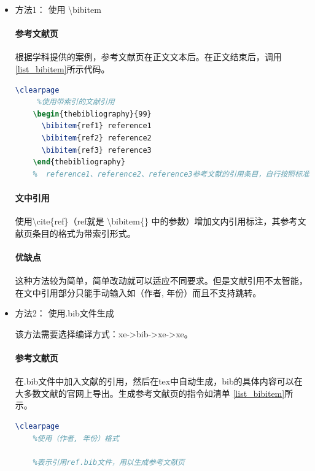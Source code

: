 \documentclass[AutoFakeBold]{ZafuThesis}
\begin{document}
\begin{itemize}
  \item 方法1： 使用 \textbackslash bibitem\par
  \paragraph{参考文献页}
  根据学科提供的案例，参考文献页在正文文本后。在正文结束后，调用 \ref{list_bibitem}所示代码。
  \begin{lstlisting}[language = tex,caption = 使用\textbackslash bibitem,label = list_bibitem]
    \clearpage
     %使用带索引的文献引用
    \begin{thebibliography}{99}
      \bibitem{ref1} reference1
      \bibitem{ref2} reference2
      \bibitem{ref3} reference3
    \end{thebibliography}
    %  reference1、reference2、reference3参考文献的引用条目，自行按照标准填写参考文献引用格式
  \end{lstlisting}
  \paragraph{文中引用}
  使用\textbackslash cite\{ref\}（ref就是 \textbackslash bibitem\{\} 中的参数）增加文内引用标注，其参考文献页条目的格式为带索引形式。
  \paragraph{优缺点}
  这种方法较为简单，简单改动就可以适应不同要求。但是文献引用不太智能，在文中引用部分只能手动输入如（作者, 年份）而且不支持跳转。

  \item 方法2： 使用.bib文件生成\par
  该方法需要选择编译方式：xe->bib->xe->xe。
  \paragraph{参考文献页}
  在.bib文件中加入文献的引用，然后在tex中自动生成，bib的具体内容可以在大多数文献的官网上导出。生成参考文献页的指令如清单 \ref{list_bibitem}所示。
  \begin{lstlisting}[language = tex,caption = 使用\textbackslash bibitem,label = list_bibitem]
    \clearpage
    %使用（作者, 年份）格式
     
    %表示引用ref.bib文件，用以生成参考文献页
    
  \end{lstlisting}\par


\end{itemize}
\end{document}
